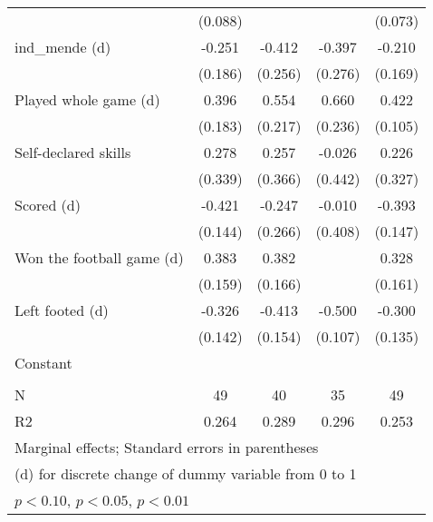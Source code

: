{\begin{tabular}{l*{4}{c}}
                    &     (0.088)         &                     &                     &     (0.073)         \\
[1em]
ind\_mende (d)       &      -0.251         &      -0.412         &      -0.397         &      -0.210         \\
                    &     (0.186)         &     (0.256)         &     (0.276)         &     (0.169)         \\
[1em]
Played whole game (d)&       0.396\sym{**} &       0.554\sym{**} &       0.660\sym{***}&       0.422\sym{***}\\
                    &     (0.183)         &     (0.217)         &     (0.236)         &     (0.105)         \\
[1em]
Self-declared skills&       0.278         &       0.257         &      -0.026         &       0.226         \\
                    &     (0.339)         &     (0.366)         &     (0.442)         &     (0.327)         \\
[1em]
Scored (d)          &      -0.421\sym{***}&      -0.247         &      -0.010         &      -0.393\sym{***}\\
                    &     (0.144)         &     (0.266)         &     (0.408)         &     (0.147)         \\
[1em]
Won the football game (d)&       0.383\sym{**} &       0.382\sym{**} &                     &       0.328\sym{**} \\
                    &     (0.159)         &     (0.166)         &                     &     (0.161)         \\
[1em]
Left footed (d)     &      -0.326\sym{**} &      -0.413\sym{***}&      -0.500\sym{***}&      -0.300\sym{**} \\
                    &     (0.142)         &     (0.154)         &     (0.107)         &     (0.135)         \\
[1em]
Constant            &                     &                     &                     &                     \\
                    &                     &                     &                     &                     \\
\hline
N                   &          49         &          40         &          35         &          49         \\
R2                  &       0.264         &       0.289         &       0.296         &       0.253         \\
\hline\hline
\multicolumn{5}{l}{\footnotesize Marginal effects; Standard errors in parentheses}\\
\multicolumn{5}{l}{\footnotesize  (d) for discrete change of dummy variable from 0 to 1}\\
\multicolumn{5}{l}{\footnotesize \sym{*} \(p<0.10\), \sym{**} \(p<0.05\), \sym{***} \(p<0.01\)}\\
\end{tabular}
}
